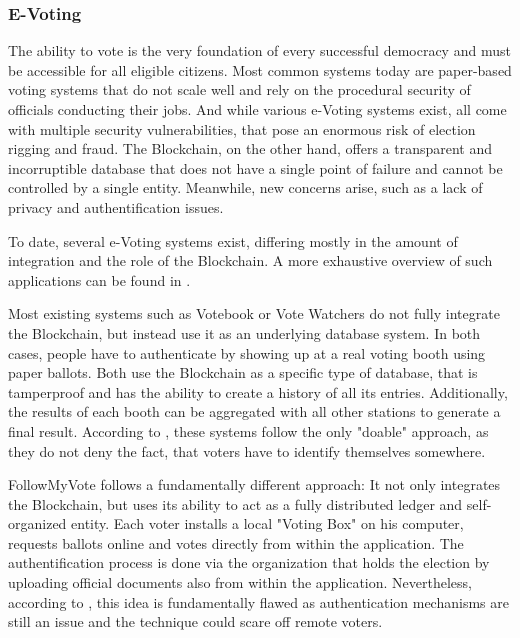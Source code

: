 \subsubsection{E-Voting}
\label{subsec:03_applications_evoting}
The ability to vote is the very foundation of every successful democracy and must be accessible for all eligible citizens. Most common systems today are paper-based voting systems that do not scale well and rely on the procedural security of officials conducting their jobs. And while various e-Voting systems exist, all come with multiple security vulnerabilities, that pose an enormous risk of election rigging and fraud.
The Blockchain, on the other hand, offers a transparent and incorruptible database that does not have a single point of failure and cannot be controlled by a single entity. Meanwhile, new concerns arise, such as a lack of privacy and authentification issues.

To date, several e-Voting systems exist, differing mostly in the amount of integration and the role of the Blockchain. A more exhaustive overview of such applications can be found in \cite{BenAyed2017}.

Most existing systems such as Votebook \cite{Kirby2016} or Vote Watchers \cite{BlockchainTechnologiesCorporation} do not fully integrate the Blockchain, but instead use it as an underlying database system. In both cases, people have to authenticate by showing up at a real voting booth using paper ballots. Both use the Blockchain as a specific type of database, that is tamperproof and has the ability to create a history of all its entries. Additionally, the results of each booth can be aggregated with all other stations to generate a final result\cite{BenAyed2017}.
According to \cite{Osgood2016}, these systems follow the only "doable" approach, as they do not deny the fact, that voters have to identify themselves somewhere.

FollowMyVote \cite{FollowMyVote} follows a fundamentally different approach: It not only integrates the Blockchain, but uses its ability to act as a fully distributed ledger and self-organized entity. Each voter installs a local "Voting Box" on his computer, requests ballots online and votes directly from within the application. The authentification process is done via the organization that holds the election by uploading official documents also from within the application. Nevertheless, according to \cite{Osgood2016}, this idea is fundamentally flawed as authentication mechanisms are still an issue and the technique could scare off remote voters.

